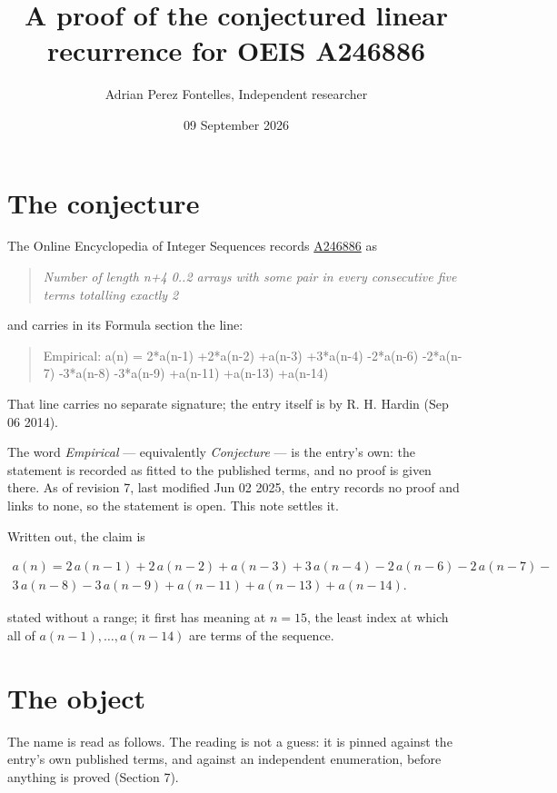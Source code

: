 \documentclass[11pt]{article}
\title{A proof of the conjectured linear recurrence for OEIS A246886}
\author{Adrian Perez Fontelles, Independent researcher}
\date{09 September 2026}
\theoremstyle{definition}
\begin{document}
\maketitle
\section{The conjecture}

The Online Encyclopedia of Integer Sequences records \href{https://oeis.org/A246886}{A246886} as

\begin{quote}\itshape Number of length n+4 0..2 arrays with some pair in every consecutive five terms totalling exactly 2\end{quote}

and carries in its Formula section the line:

\begin{quote}\ttfamily Empirical: a(n) = 2*a(n-1) +2*a(n-2) +a(n-3) +3*a(n-4) -2*a(n-6) -2*a(n-7) -3*a(n-8) -3*a(n-9) +a(n-11) +a(n-13) +a(n-14)\end{quote}

That line carries no separate signature; the entry itself is by R. H. Hardin (Sep 06 2014).

The word {\itshape Empirical} --- equivalently {\itshape Conjecture} --- is the entry's own: the statement is recorded as fitted to the published terms, and no proof is given there. As of revision 7, last modified Jun 02 2025, the entry records no proof and links to none, so the statement is open. This note settles it.

Written out, the claim is

\begin{multline*} a(n) = 2\,a(n-1) + 2\,a(n-2) + a(n-3) + 3\,a(n-4) - 2\,a(n-6) - 2\,a(n-7) - \\ 3\,a(n-8) - 3\,a(n-9) + a(n-11) + a(n-13) + a(n-14). \end{multline*}

stated without a range; it first has meaning at $n = 15$, the least index at which all of $a(n-1),\dots,a(n-14)$ are terms of the sequence.

\section{The object}

The name is read as follows. The reading is not a guess: it is pinned against the entry's own published terms, and against an independent enumeration, before anything is proved (Section 7).
\end{document}
